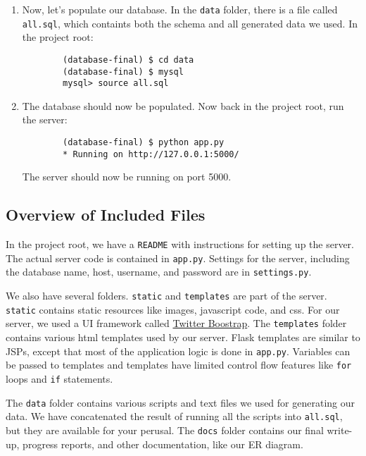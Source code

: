 \documentclass{article}
\begin{document}
\begin{enumerate}
    \item Now, let's populate our database. In the {\tt data} folder, there 
        is a file called {\tt all.sql}, which containts both the schema and 
        all generated data we used. In the project root:
        \begin{verbatim}
        (database-final) $ cd data
        (database-final) $ mysql
        mysql> source all.sql
        \end{verbatim}

    \item The database should now be populated. Now back in the project root,  run the server:
        \begin{verbatim}
        (database-final) $ python app.py
        * Running on http://127.0.0.1:5000/
        \end{verbatim}

    The server should now be running on port 5000.
\end{enumerate}


\subsection*{Overview of Included Files}

In the project root, we have a {\tt README} with instructions for setting up the server. 
The actual server code is contained in {\tt app.py}. Settings for the server, including
the database name, host, username, and password are in {\tt settings.py}. 

We also have several folders. {\tt static} and {\tt templates} are part of the server.
{\tt static} contains static resources like images, javascript code, and css. For our
server, we used a UI framework called \href{http://twitter.github.com/bootstrap/}{Twitter Boostrap}. 
The {\tt templates} folder contains various html templates used by our server. Flask
templates are similar to JSPs, except that most of the application logic is done in {\tt app.py}.
Variables can be passed to templates and templates have limited control flow features like
{\tt for} loops and {\tt if} statements. 

The {\tt data} folder contains various scripts and text files we used for generating
our data. We have concatenated the result of running all the scripts into {\tt all.sql},
but they are available for your perusal. The {\tt docs} folder contains our final
write-up, progress reports, and other documentation, like our ER diagram. 
\end{document}
